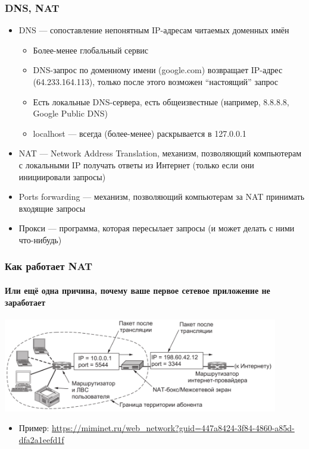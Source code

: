 \documentclass{../../slides-style}
\begin{document}
    \begin{frame}
        \frametitle{DNS, NAT}
        \begin{itemize}
            \item DNS --- сопоставление непонятным IP-адресам читаемых доменных имён
            \begin{itemize}
                \item Более-менее глобальный сервис
                \item DNS-запрос по доменному имени (google.com) возвращает IP-адрес (64.233.164.113), только после этого возможен ``настоящий'' запрос
                \item Есть локальные DNS-сервера, есть общеизвестные (например, 8.8.8.8, Google Public DNS)
                \item localhost --- всегда (более-менее) раскрывается в 127.0.0.1
            \end{itemize}
            \item NAT --- Network Address Translation, механизм, позволяющий компьютерам с локальными IP получать ответы из Интернет (только если они инициировали запросы)
            \item Ports forwarding --- механизм, позволяющий компьютерам за NAT принимать входящие запросы
            \item Прокси --- программа, которая пересылает запросы (и может делать с ними что-нибудь)
        \end{itemize}
    \end{frame}

    \begin{frame}
        \frametitle{Как работает NAT}
        \framesubtitle{Или ещё одна причина, почему ваше первое сетевое приложение не заработает}
        \begin{center}
            \includegraphics[width=0.9\textwidth]{nat.png}
        \end{center}
        \begin{itemize}
            \item Пример: \url{https://miminet.ru/web_network?guid=447a8424-3f84-4860-a85d-dfa2a1eefd1f}
        \end{itemize}
    \end{frame}
\end{document}
